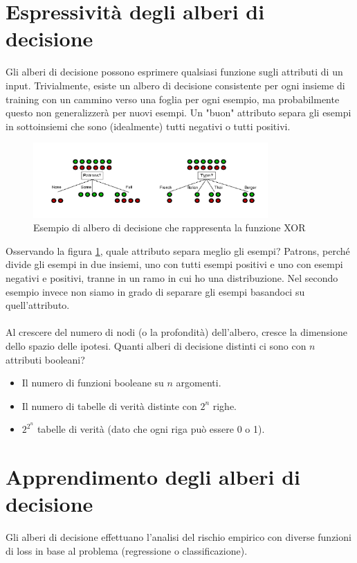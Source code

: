 \section{Espressività degli alberi di decisione}
Gli alberi di decisione possono esprimere qualsiasi funzione sugli attributi di un input.
Trivialmente, esiste un albero di decisione consistente per ogni insieme di training con un cammino verso una foglia per ogni esempio, ma probabilmente questo non generalizzerà per nuovi esempi.
Un "buon" attributo separa gli esempi in sottoinsiemi che sono (idealmente) tutti negativi o tutti positivi.
\begin{figure}[H]
	\centering
	\includegraphics[width=0.8\textwidth]{pictures/separazioneDT.png}
	\caption{Esempio di albero di decisione che rappresenta la funzione XOR}
	\label{fig:DTsep}
\end{figure} \noindent
Osservando la figura \ref{fig:DTsep}, quale attributo separa meglio gli esempi? Patrons, perché divide gli esempi in due insiemi, uno con tutti esempi positivi e uno con esempi negativi e positivi, tranne in un ramo in cui ho una distribuzione.
Nel secondo esempio invece non siamo in grado di separare gli esempi basandoci su quell'attributo.
\\ \\
Al crescere del numero di nodi (o la profondità) dell'albero, cresce la dimensione dello spazio delle ipotesi.
Quanti alberi di decisione distinti ci sono con $n$ attributi booleani?
\begin{itemize}
	\item Il numero di funzioni booleane su $n$ argomenti.
	\item Il numero di tabelle di verità distinte con $2^n$ righe.
	\item $2^{2^n}$ tabelle di verità (dato che ogni riga può essere 0 o 1).
\end{itemize}
\section{Apprendimento degli alberi di decisione}
Gli alberi di decisione effettuano l'analisi del rischio empirico con diverse funzioni di loss in base al problema (regressione o classificazione).

